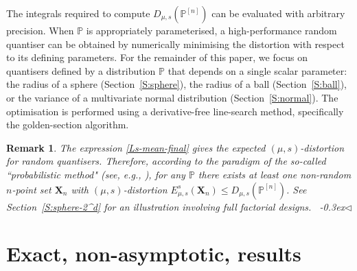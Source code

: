 \documentclass{article}
\newcommand{\Luc}{\color{magenta} }
\def\SX{{\mathscr X}}
\def\Xb{\mathbf{X}}
\def\PP{\mathbb{P}}
\def\SS{{\mathcal S}}
\newcommand{\bea}{\begin{eqnarray*}}
\newcommand{\eea}{\end{eqnarray*}}
\newcommand{\fin} {\mbox{}~\hfill{\lower-0.3ex\hbox{$\triangleleft$}}}
\newtheorem{remark}{Remark}[section]
\begin{document}
The integrals required to compute $D_{\mu,s}(\PP^{[n]})$ can be evaluated with arbitrary precision. When $\PP$ is appropriately parameterised, a high-performance random quantiser can be obtained by numerically minimising the distortion with respect to its defining parameters. For the remainder of this paper, we focus on quantisers defined by a distribution $\PP$ that depends on a single scalar parameter: the radius of a sphere (Section~\ref{S:sphere}), the radius of a ball (Section~\ref{S:ball}), or the variance of a multivariate normal distribution (Section~\ref{S:normal}). The optimisation is performed using a derivative-free line-search method, specifically the golden-section algorithm.

%


\begin{remark}
The expression \eqref{Ls-mean-final} gives the expected $(\mu,s)$-distortion for random quantisers. Therefore, according to the paradigm of the so-called ``probabilistic method" (see, e.g., \cite{AlonS2000}), for any $\PP$ there exists at least one non-random $n$-point set $\Xb_n$ with $(\mu,s)$-distortion $E_{\mu,s}^s(\Xb_n)\leq D_{\mu,s}(\PP^{[n]})$. See Section~\ref{S:sphere-2^d} for an illustration involving full factorial designs.
\fin
\end{remark}



\section{Exact, non-asymptotic, results}\label{S:ball-sphere-annulus}
\end{document}
